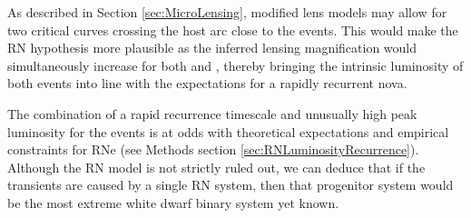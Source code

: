As described in Section \ref{sec:MicroLensing}, modified lens models
may allow for two critical curves crossing the host arc close to the
\spock events.  This would make the RN hypothesis more plausible as
the inferred lensing magnification would simultaneously increase for
both \spockone and \spocktwo, thereby bringing the intrinsic
luminosity of both events into line with the expectations for a
rapidly recurrent nova.

The combination of a rapid recurrence timescale and unusually high
peak luminosity for the \spock events is at odds with theoretical
expectations and empirical constraints for RNe (see Methods section
\ref{sec:RNLuminosityRecurrence}). Although the RN model is not
strictly ruled out, we can deduce that if the \spock transients are
caused by a single RN system, then that progenitor system would be the
most extreme white dwarf binary system yet known.
